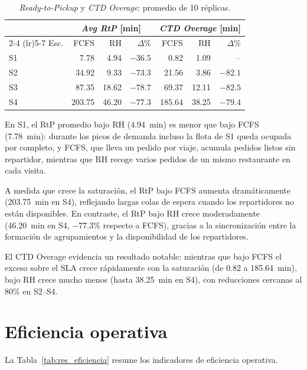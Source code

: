\documentclass[12pt,letterpaper,oneside]{book}
\begin{document}
	\begin{table}[htbp]
	\centering
	\small
	\caption{\textit{Ready-to-Pickup} y \textit{CTD Overage}: promedio de 10 réplicas.}
	\label{tab:res_rtp}
	\begin{tabular}{@{}l rr r rr r@{}}
	\toprule
	& \multicolumn{3}{c}{\textit{Avg RtP} [min]} & \multicolumn{3}{c}{\textit{CTD Overage} [min]} \\
	\cmidrule(lr){2-4} \cmidrule(lr){5-7}
	Esc. & FCFS & RH & $\Delta$\% & FCFS & RH & $\Delta$\% \\
	\midrule
	S1 & 7.78   & 4.94  & $-36.5$ & 0.82   & 1.09  & --      \\
	S2 & 34.92  & 9.33  & $-73.3$ & 21.56  & 3.86  & $-82.1$ \\
	S3 & 87.35  & 18.62 & $-78.7$ & 69.37  & 12.11 & $-82.5$ \\
	S4 & 203.75 & 46.20 & $-77.3$ & 185.64 & 38.25 & $-79.4$ \\
	\bottomrule
	\end{tabular}
	\end{table}

	En S1, el RtP promedio bajo RH (4.94~min) es menor que bajo FCFS (7.78~min):
	durante los picos de demanda incluso la flota de S1 queda ocupada por completo, y
	FCFS, que lleva un pedido por viaje, acumula pedidos listos sin repartidor, mientras
	que RH recoge varios pedidos de un mismo restaurante en cada visita.

	A medida que crece la saturación, el RtP bajo FCFS aumenta dramáticamente
	(203.75~min en S4), reflejando largas colas de espera cuando los repartidores no
	están disponibles.  En contraste, el RtP bajo RH crece moderadamente
	(46.20~min en S4, $-77.3\%$ respecto a FCFS), gracias a la sincronización
	entre la formación de agrupamientos y la disponibilidad de los repartidores.

	El CTD Overage evidencia un resultado notable: mientras que bajo FCFS el
	exceso sobre el SLA crece rápidamente con la saturación (de 0.82 a
	185.64~min), bajo RH crece mucho menos (hasta 38.25~min en S4), con reducciones
	cercanas al 80\% en S2--S4.

	\section{Eficiencia operativa}

	La Tabla~\ref{tab:res_eficiencia} resume los indicadores de eficiencia operativa.
\end{document}
